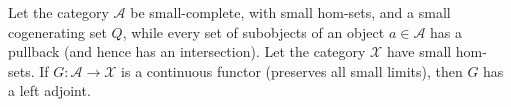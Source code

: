 Let the category $\mathcal{A}$ be small-complete, with small hom-sets, and a small cogenerating set $Q$, while every set of subobjects of an object $a \in \mathcal{A}$ has a pullback (and hence has an intersection). Let the category $\mathcal{X}$ have small hom-sets. If $G : \mathcal{A} \to \mathcal{X}$ is a continuous functor (preserves all small limits), then $G$ has a left adjoint.
